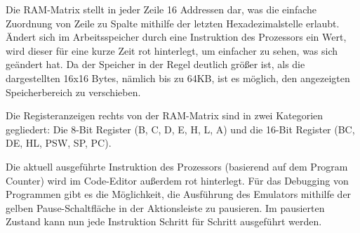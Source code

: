 Die \ac{RAM}-Matrix stellt in jeder Zeile 16 Addressen dar, was die einfache Zuordnung von Zeile zu Spalte mithilfe der letzten Hexadezimalstelle erlaubt. Ändert sich im Arbeitsspeicher durch eine Instruktion des Prozessors ein Wert, wird dieser für eine kurze Zeit rot hinterlegt, um einfacher zu sehen, was sich geändert hat. Da der Speicher in der Regel deutlich größer ist, als die dargestellten 16x16 Bytes, nämlich bis zu 64KB, ist es möglich, den angezeigten Speicherbereich zu verschieben.

Die Registeranzeigen rechts von der \ac{RAM}-Matrix sind in zwei Kategorien gegliedert: Die 8-Bit Register (B, C, D, E, H, L, A) und die 16-Bit Register (BC, DE, HL, PSW, SP, PC).

Die aktuell ausgeführte Instruktion des Prozessors (basierend auf dem Program Counter) wird im Code-Editor außerdem rot hinterlegt. Für das Debugging von Programmen gibt es die Möglichkeit, die Ausführung des Emulators mithilfe der gelben Pause-Schaltfläche in der Aktionsleiste zu pausieren. Im pausierten Zustand kann nun jede Instruktion Schritt für Schritt ausgeführt werden.